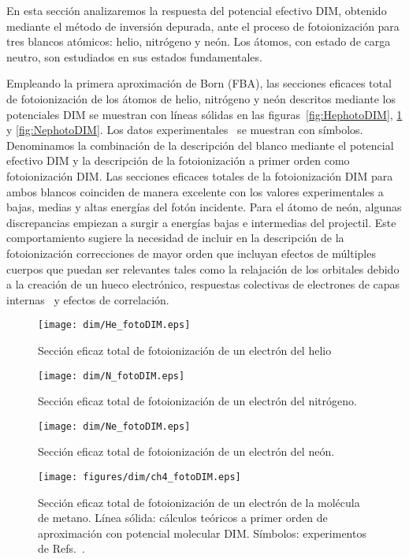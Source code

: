 En esta sección analizaremos la respuesta del potencial efectivo DIM, 
obtenido mediante el método de inversión depurada, ante el proceso de
fotoionización para tres blancos atómicos: helio, nitrógeno y neón. 
Los átomos, con estado de carga neutro, son estudiados en sus estados
fundamentales.

Empleando la primera aproximación de Born (FBA), las secciones eficaces
total de fotoionización de los átomos de helio, nitrógeno y neón descritos 
mediante los potenciales DIM se muestran con líneas sólidas en las 
figuras~\ref{fig:HephotoDIM}, \ref{fig:NphotoDIM} y \ref{fig:NephotoDIM}.
Los datos experimentales~\cite{Henke:93,Samson:90,Samson:02,Stolte:16} 
se muestran con símbolos. Denominamos la combinación de la 
descripción del blanco mediante el potencial efectivo DIM y la descripción 
de la fotoionización a primer orden como fotoionización DIM. 
Las secciones eficaces totales de la fotoionización DIM para ambos 
blancos coinciden de manera excelente con los valores experimentales
a bajas, medias y altas energías del fotón incidente. Para el átomo de
neón, algunas discrepancias empiezan a surgir a energías bajas e 
intermedias del projectil. Este comportamiento sugiere la necesidad de 
incluir en la descripción de la fotoionización correcciones de mayor 
orden que incluyan efectos de múltiples cuerpos que puedan ser 
relevantes tales como la relajación de los orbitales debido a la 
creación de un hueco electrónico, respuestas colectivas de electrones 
de capas internas~\cite{Ederer:64} y efectos de correlación.

\begin{figure}
\centering
 \texttt{[image: dim/He\_fotoDIM.eps]}
\caption[Fotoionización de helio.]
{Sección eficaz total de fotoionización de un electrón del helio}
\label{fig:HephotoDIM}
\vspace{0.5cm}
 \texttt{[image: dim/N\_fotoDIM.eps]}
\caption[Fotoionización de nitrógeno.]
{Sección eficaz total de fotoionización de un electrón del 
nitrógeno.}
\label{fig:NphotoDIM}
\end{figure}

\begin{figure}
\centering
 \texttt{[image: dim/Ne\_fotoDIM.eps]}
\caption[Fotoionización de neón.]
{Sección eficaz total de fotoionización de un electrón del neón.}
\label{fig:NephotoDIM}
\vspace{0.5cm}
 \texttt{[image: figures/dim/ch4\_fotoDIM.eps]}
\caption[Fotoionización de metano.]
{Sección eficaz total de fotoionización de un electrón de la
molécula de metano. Línea sólida: cálculos teóricos a primer orden de 
aproximación con potencial molecular DIM. Símbolos: experimentos de 
Refs.~\cite{Lukirskii:64,Henke:82,Samson:89}.}
\label{fig:photoch4}
\end{figure}

